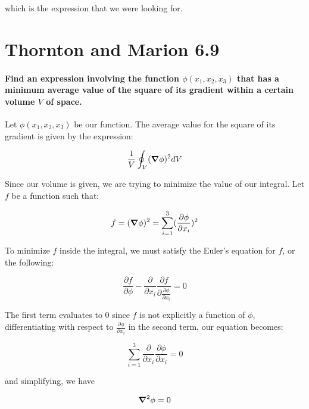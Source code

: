 \documentclass{article}
\numberwithin{equation}{section}
\begin{document}
which is the expression that we were looking for.

\section{Thornton and Marion 6.9}

\paragraph{Find an expression involving the function $\phi(x_1, x_2, x_3)$ that has a minimum average value of the square of its gradient within a certain volume $V$ of space.\\}

Let $\phi(x_1, x_2, x_3)$ be our function. The average value for the square of its gradient is given by the expression:

\begin{equation}
    \frac{1}{V}\oint_V (\grad \phi)^2 dV
\end{equation}

Since our volume is given, we are trying to minimize the value of our integral. Let $f$ be a function such that:

\begin{equation}
    f = (\grad \phi )^2 = \sum_{i=1}^3 (\frac{\partial \phi}{\partial x_i})^2
\end{equation}

To minimize $f$ inside the integral, we must satisfy the Euler's equation for $f$, or the following:

\begin{equation}
     \frac{\partial f}{\partial \phi} - \frac{\partial}{\partial x_i} \frac{\partial f}{\partial \frac{\partial \phi}{\partial x_i}} = 0
\end{equation}

The first term evaluates to $0$ since $f$ is not explicitly a function of $\phi$, differentiating with respect to $\frac{\partial \phi}{\partial x_i}$ in the second term, our equation becomes:

\begin{equation}
    \sum_{i=1}^3 \frac{\partial}{\partial x_i} \frac{\partial \phi}{\partial x_i} = 0
\end{equation}

and simplifying, we have

\begin{equation}
    \grad^2 \phi = 0
\end{equation}
\end{document}
